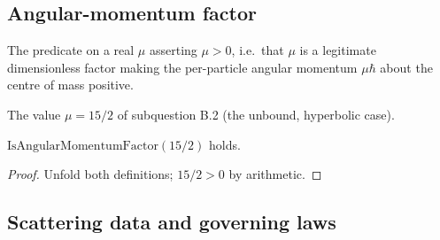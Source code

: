 \subsection*{Angular-momentum factor}

\begin{definition}
\label{def:IPhO2026Problems_problem_IPhO_2026_1_B_2:IsAngularMomentumFactor}
The predicate on a real $\mu$ asserting $\mu > 0$, i.e.\ that $\mu$ is a
legitimate dimensionless factor making the per-particle angular momentum
$\mu\hbar$ about the centre of mass positive.
\end{definition}

\begin{definition}[The unbound-case value $\mu = 15/2$]
\label{def:IPhO2026Problems_problem_IPhO_2026_1_B_2:unboundMu}
The value $\mu = 15/2$ of subquestion B.2 (the unbound, hyperbolic case).
\end{definition}

\begin{lemma}
\label{lem:IPhO2026Problems_problem_IPhO_2026_1_B_2:unboundMu_isAngularMomentumFactor}
$\mathrm{IsAngularMomentumFactor}(15/2)$ holds.
\end{lemma}
\begin{proof}
Unfold both definitions; $15/2 > 0$ by arithmetic.
\end{proof}

\subsection*{Scattering data and governing laws}

